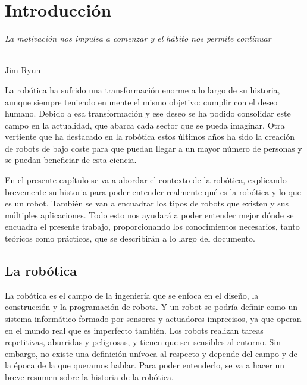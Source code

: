 \chapter{Introducción}
\label{cap:capitulo1}
\setcounter{page}{1}

\begin{flushright}
\begin{minipage}[]{10cm}
\emph{La motivación nos impulsa a comenzar y el hábito nos permite continuar}\\
\end{minipage}\\

Jim Ryun\\
\end{flushright}

\vspace{1cm}

La robótica ha sufrido una transformación enorme a lo largo de su historia, aunque siempre teniendo en mente el mismo objetivo: cumplir con el deseo humano. Debido a esa transformación y ese deseo se ha podido consolidar este campo en la actualidad, que abarca cada sector que se pueda imaginar. Otra vertiente que ha destacado en la robótica estos últimos años ha sido la creación de robots de bajo coste para que puedan llegar a un mayor número de personas y se puedan beneficiar de esta ciencia. 

En el presente capítulo se va a abordar el contexto de la robótica, explicando brevemente su historia para poder entender realmente qué es la robótica y lo que es un robot. También se van a encuadrar los tipos de robots que existen y sus múltiples aplicaciones. Todo esto nos ayudará a poder entender mejor dónde se encuadra el presente trabajo, proporcionando los conocimientos necesarios, tanto teóricos como prácticos, que se describirán a lo largo del documento.

\section{La robótica}
\label{sec:robotica} %

La robótica es el campo de la ingeniería que se enfoca en el diseño, la construcción y la programación de robots. Y un robot se podría definir como un sistema informático formado por sensores y actuadores imprecisos, ya que operan en el mundo real que es imperfecto también. Los robots realizan tareas repetitivas, aburridas y peligrosas, y tienen que ser sensibles al entorno. Sin embargo, no existe una definición unívoca al respecto y depende del campo y de la época de la que queramos hablar. Para poder entenderlo, se va a hacer un breve resumen sobre la historia de la robótica.\\

